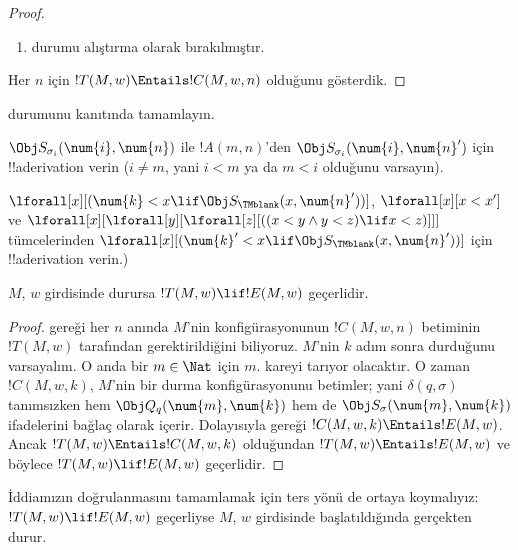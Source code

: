 \begin{proof}
\begin{enumerate}
\item {} durumu alıştırma olarak bırakılmıştır.
\end{enumerate}
Her $n$ için $!T(M,w)\Entails !C(M,w,n)$ olduğunu gösterdik.
\end{proof}

\begin{prob}
 durumunu
 kanıtında tamamlayın.
\end{prob}

\begin{prob}
$\Obj S_{\sigma_i}(\num{i},\num{n})$ ile $!A(m,n)$'den
$\Obj S_{\sigma_i}(\num{i},\num{n}')$ için !!a{derivation} verin
($i\neq m$, yani $i<m$ ya da $m<i$ olduğunu varsayın).
\end{prob}

\begin{prob}
$\lforall[x][(\num{k}<x\lif\Obj S_\TMblank(x,\num{n}'))]$,
$\lforall[x][x<x']$ ve
$\lforall[x][\lforall[y][\lforall[z][ ((x < y \land y < z) \lif x <
      z)]]]$ tümcelerinden
$\lforall[x][(\num{k}'<x\lif\Obj S_\TMblank(x,\num{n}'))]$ için
!!a{derivation} verin.)
\end{prob}


\begin{lem}
$M$, $w$ girdisinde durursa $!T(M,w)\lif !E(M,w)$ geçerlidir.
\end{lem}

\begin{proof}
 gereği her $n$ anında $M$'nin konfigürasyonunun
$!C(M,w,n)$ betiminin $!T(M,w)$ tarafından gerektirildiğini biliyoruz.
$M$'nin $k$ adım sonra durduğunu varsayalım. O anda bir $m\in\Nat$ için $m$.
kareyi tarıyor olacaktır. O zaman $!C(M,w,k)$, $M$'nin bir durma
konfigürasyonunu betimler; yani $\delta(q,\sigma)$ tanımsızken hem
$\Obj Q_q(\num{m},\num{k})$ hem de
$\Obj S_\sigma(\num{m},\num{k})$ ifadelerini bağlaç olarak içerir.
Dolayısıyla  gereği
$!C(M,w,k)\Entails !E(M,w)$. Ancak
$!T(M,w)\Entails !C(M,w,k)$ olduğundan $!T(M,w)\Entails !E(M,w)$ ve böylece
$!T(M,w)\lif !E(M,w)$ geçerlidir.
\end{proof}


\begin{explain} 
İddiamızın doğrulanmasını tamamlamak için ters yönü de ortaya koymalıyız:
$!T(M,w)\lif !E(M,w)$ geçerliyse $M$, $w$ girdisinde başlatıldığında
gerçekten durur.
\end{explain}

